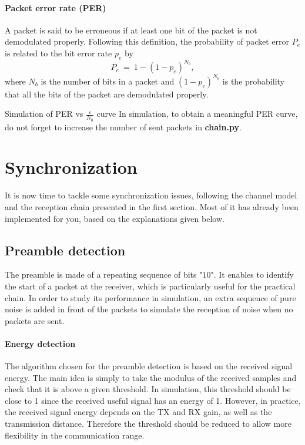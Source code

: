 \paragraph{Packet error rate (PER)} A packet is said to be erroneous if at least one bit of the packet is not demodulated properly. Following this definition, the probability of packet error $P_e$ is related to the bit error rate $p_e$ by
\begin{equation*}
    P_e\:=\:1- (1-p_e)^{N_b},
\end{equation*}
where $N_b$ is the number of bits in a packet and $(1-p_e)^{N_b}$ is the probability that all the bits of the packet are demodulated properly.
\begin{bclogo}[couleur = gray!20, arrondi = 0.2, logo=\bccrayon]{Simulation of PER vs $\frac{\varepsilon}{N_0}$ curve}
In simulation, to obtain a meaningful PER curve, do not forget to increase the number of sent packets in \textbf{chain.py}.
\end{bclogo}



\section{Synchronization}
It is now time to tackle some synchronization issues, following the channel model and the reception chain presented in the first section. Most of it has already been implemented for you, based on the explanations given below.

\subsection{Preamble detection}
The preamble is made of a repeating sequence of bits "$10$". It enables to identify the start of a packet at the receiver, which is particularly useful for the practical chain. In order to study its performance in simulation, an extra sequence of pure noise is added in front of the packets to simulate the reception of noise when no packets are sent.

\paragraph{Energy detection} The algorithm chosen for the preamble detection is based on the received signal energy. The main idea is simply to take the modulus of the received samples and check that it is above a given threshold. In simulation, this threshold should be close to 1 since the received useful signal has an energy of 1. However, in practice, the received signal energy depends on the TX and RX gain, as well as the transmission distance. Therefore the threshold should be reduced to allow more flexibility in the communication range.

